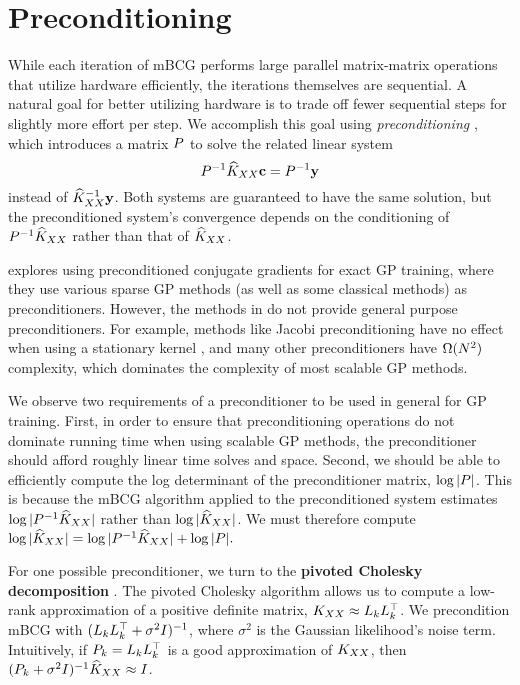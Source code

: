 \section{Preconditioning}
\label{sec:preconditioning}

While each iteration of mBCG performs large parallel matrix-matrix operations that utilize hardware efficiently, the iterations themselves are sequential.
A natural goal for better utilizing hardware is to trade off fewer sequential steps for slightly more effort per step.
We accomplish this goal using \emph{preconditioning} \cite{golub2012matrix,saad2003iterative,demmel1997applied,van2003iterative}, which introduces a matrix $P$ to solve the related linear system
\begin{equation*}
  P^{-1} \widehat{K}_{XX} \mathbf{c} = P^{-1}\mathbf{y}
\end{equation*}
instead of $\widehat{K}_{XX}^{-1} \mathbf{y}$.
Both systems are guaranteed to have the same solution, but the preconditioned system's convergence depends on the conditioning of $P^{-1}\widehat{K}_{XX}$ rather than that of $\widehat{K}_{XX}$.

\citet{cutajar2016preconditioning} explores using preconditioned conjugate gradients for exact GP training, where they use various sparse GP methods (as well as some classical methods) as preconditioners.
However, the methods in \citet{cutajar2016preconditioning} do not provide general purpose preconditioners.
For example, methods like Jacobi preconditioning have no effect when using a stationary kernel \cite{cutajar2016preconditioning,wilson2015thoughts}, and many other preconditioners have $\bigomega{N^{2}}$ complexity, which dominates the complexity of most scalable GP methods.

We observe two requirements of a preconditioner to be used in general for GP training.
First, in order to ensure that preconditioning operations do not dominate running time when using scalable GP methods, the preconditioner should afford roughly linear time solves and space.
Second, we should be able to efficiently compute the log determinant of the preconditioner matrix, $\log \vert P \vert$.
This is because the mBCG algorithm applied to the preconditioned system estimates $\log \vert P^{-1}\widehat{K}_{XX} \vert$ rather than $\log \vert \widehat{K}_{XX} \vert$. We must therefore compute
$
  \label{eq:logdet_adjusted}
  \log \vert \widehat{K}_{XX} \vert = \log \vert P^{-1}\widehat{K}_{XX} \vert + \log \vert P \vert.
$

For one possible preconditioner, we turn to the {\bf pivoted Cholesky decomposition} \cite{harbrecht2012low}.
The pivoted Cholesky algorithm allows us to compute a low-rank approximation of a positive definite matrix, $K_{XX} \approx L_{k} L_{k}^{\top}$.
We precondition mBCG with $(L_k L_k^\top + \sigma^2 I)^{-1}$, where $\sigma^2$ is the Gaussian likelihood's noise term.
Intuitively, if $P_{k}=L_{k}L_{k}^{\top}$ is a good approximation of $K_{XX}$, then $(P_{k} + \sigma^{2}I)^{-1}\widehat{K}_{XX} \approx I$.

